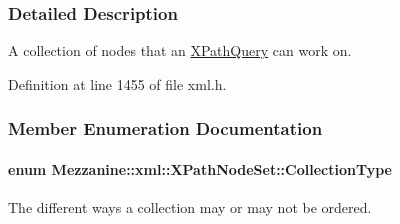 \subsubsection{Detailed Description}
A collection of nodes that an \hyperlink{classMezzanine_1_1xml_1_1XPathQuery}{XPathQuery} can work on. 

Definition at line 1455 of file xml.h.



\subsubsection{Member Enumeration Documentation}
\hypertarget{classMezzanine_1_1xml_1_1XPathNodeSet_aea2172f847690de3cd556c2d4ffca2a7}{
\paragraph[{CollectionType}]{\setlength{\rightskip}{0pt plus 5cm}enum {\bf Mezzanine::xml::XPathNodeSet::CollectionType}}\hfill}
\label{classMezzanine_1_1xml_1_1XPathNodeSet_aea2172f847690de3cd556c2d4ffca2a7}


The different ways a collection may or may not be ordered. 

